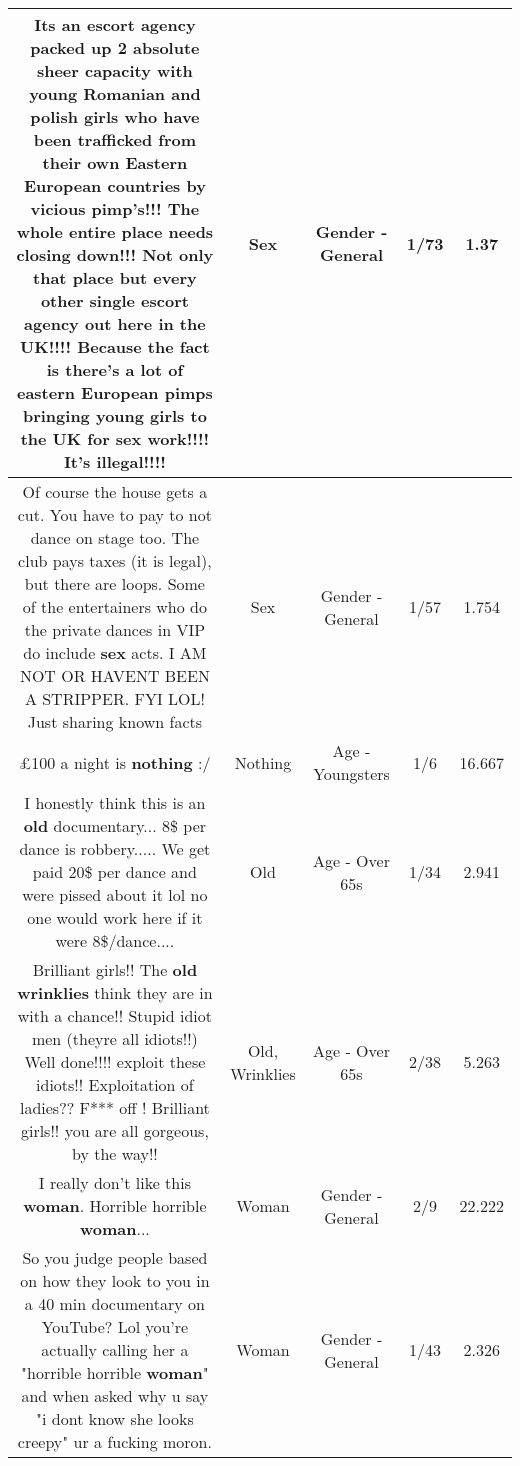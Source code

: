 \documentclass[11pt]{article}
\newlength\mylength
\begin{document}
\begin{center}
\begin{longtable}{|C{.65\mylength}|C{.30\mylength}|C{.12\mylength}|C{.12\mylength}|C{.12\mylength}|}
  \small Its an escort agency packed up 2 absolute sheer capacity with young Romanian and polish girls who have been trafficked from their own Eastern European countries by vicious pimp's!!! The whole entire place needs closing down!!! Not only that place but every other single escort agency out here in the UK!!!! Because the fact is there's a lot of eastern European pimps bringing young girls to the UK for \textbf{sex} work!!!! It's illegal!!!!\normalsize   & Sex & Gender - General & 1/73 & 1.37 \\  \hline
  \small Of course the house gets a cut. You have to pay to not dance on stage too. The club pays taxes (it is legal), but there are loops. Some of the entertainers who do the private dances in VIP do include \textbf{sex} acts. I AM NOT OR HAVENT BEEN A STRIPPER. FYI LOL! Just sharing known facts\normalsize   & Sex & Gender - General & 1/57 & 1.754 \\  \hline
  \small £100 a night is \textbf{nothing} :/\normalsize   & Nothing & Age - Youngsters & 1/6 & 16.667 \\  \hline
  \small I honestly think this is an \textbf{old} documentary... 8\$ per dance is robbery..... We get paid 20\$ per dance and were pissed about it lol no one would work here if it were 8\$/dance....\normalsize   & Old & Age - Over 65s & 1/34 & 2.941 \\  \hline
  \small Brilliant girls!! The \textbf{old} \textbf{wrinklies} think they are in with a chance!! Stupid idiot men (theyre all idiots!!) Well done!!!! exploit these idiots!! Exploitation of ladies?? F*** off ! Brilliant girls!! you are all gorgeous, by the way!!\normalsize   & Old, Wrinklies & Age - Over 65s & 2/38 & 5.263 \\  \hline
  \small I really don't like this \textbf{woman}. Horrible horrible \textbf{woman}...\normalsize   & Woman & Gender - General & 2/9 & 22.222 \\  \hline
  \small So you judge people based on how they look to you in a 40 min documentary on YouTube? Lol you're actually calling her a "horrible horrible \textbf{woman}" and when asked why u say "i dont know she looks creepy" ur a fucking moron.\normalsize   & Woman & Gender - General & 1/43 & 2.326 \\  \hline
  
\end{longtable}
\end{center}
\end{document}
